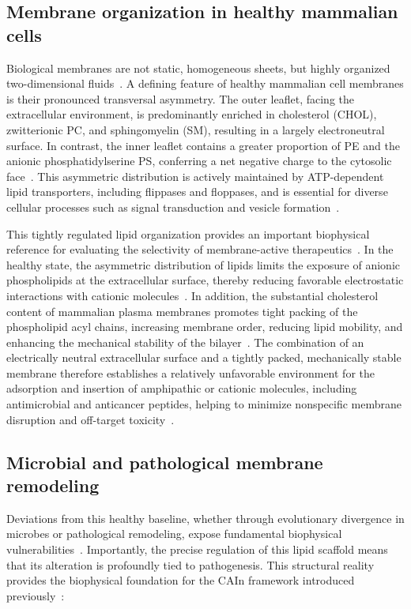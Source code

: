 \subsection{Membrane organization in healthy mammalian cells}

Biological membranes are not static, homogeneous sheets, but highly organized two-dimensional fluids~\cite{Singer1972,Nicolson2014}. A defining feature of healthy mammalian cell membranes is their pronounced transversal asymmetry. The outer leaflet, facing the extracellular environment, is predominantly enriched in cholesterol (CHOL), zwitterionic PC, and sphingomyelin (SM), resulting in a largely electroneutral surface. In contrast, the inner leaflet contains a greater proportion of PE and the anionic phosphatidylserine PS, conferring a net negative charge to the cytosolic face~\cite{van2008membrane}. This asymmetric distribution is actively maintained by ATP-dependent lipid transporters, including flippases and floppases, and is essential for diverse cellular processes such as signal transduction and vesicle formation~\cite{Holthuis2014}.

This tightly regulated lipid organization provides an important biophysical reference for evaluating the selectivity of membrane-active therapeutics~\cite{POPC_MEMBRANE,Sani2015}. In the healthy state, the asymmetric distribution of lipids limits the exposure of anionic phospholipids at the extracellular surface, thereby reducing favorable electrostatic interactions with cationic molecules~\cite{Ikeda2006,bilayer_asimetry_1}. In addition, the substantial cholesterol content of mammalian plasma membranes promotes tight packing of the phospholipid acyl chains, increasing membrane order, reducing lipid mobility, and enhancing the mechanical stability of the bilayer~\cite{van2008membrane}. The combination of an electrically neutral extracellular surface and a tightly packed, mechanically stable membrane therefore establishes a relatively unfavorable environment for the adsorption and insertion of amphipathic or cationic molecules, including antimicrobial and anticancer peptides, helping to minimize nonspecific membrane disruption and off-target toxicity~\cite{lipidomics_4}.

\subsection{Microbial and pathological membrane remodeling}

Deviations from this healthy baseline, whether through evolutionary divergence in microbes or pathological remodeling, expose fundamental biophysical vulnerabilities~\cite{BACTERIA_MEMBRANE,CANCER_MEMBRANE}. Importantly, the precise regulation of this lipid scaffold means that its alteration is profoundly tied to pathogenesis. This structural reality provides the biophysical foundation for the CAIn framework introduced previously~\cite{Casares2019}:

